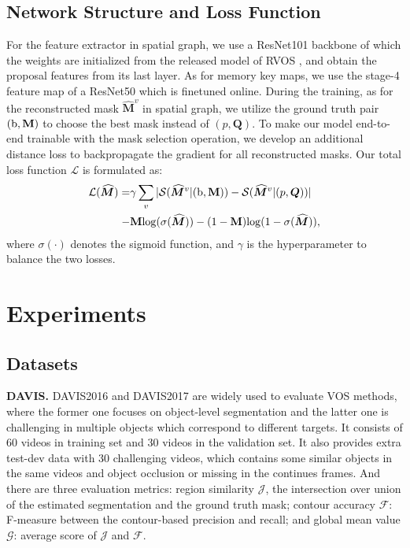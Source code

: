 \documentclass[letterpaper]{article} \usepackage{aaai21}  \usepackage{times}  \usepackage{helvet} \usepackage{courier}  \usepackage[hyphens]{url}  \usepackage{graphicx} \urlstyle{rm} \def\UrlFont{\rm}  \usepackage{graphicx}  \usepackage{natbib}  \usepackage{caption} \frenchspacing  \setlength{\pdfpagewidth}{8.5in}  \setlength{\pdfpageheight}{11in}  \usepackage{amsmath}
\begin{document}
\subsection{Network Structure and Loss Function}
For the feature extractor in spatial graph, we use a ResNet101 backbone of which the weights are initialized from the released model of RVOS \cite{ventura2019rvos}, and obtain the proposal features from its last layer. As for memory key maps, we use the stage-4 feature map of a ResNet50 which is finetuned online. During the training, as for the reconstructed mask $\widehat{\bm{M}}^{v}$ in spatial graph, we utilize the ground truth pair $(\rm{b}, \textbf{M})$ to choose the best mask instead of $(p,\bm{Q})$. To make our model end-to-end trainable with the mask selection operation, we develop an additional distance loss to backpropagate the gradient for all reconstructed masks. Our total loss function $\mathcal{L}$ is formulated as:
\begin{align}
    \mathcal{L}(\widehat{\bm{M}}) = & \gamma\sum_{v} |{\mathcal{S}}(\widehat{\bm{M}}^{v}|({\rm{b}, \textbf{M}}))-{\mathcal{S}}(\widehat{\bm{M}}^{v}|({p, \bm{Q}}))| \nonumber\\
    - & {\rm \textbf{M}}{\rm log}(\sigma(\widehat{\bm{M}})) - (1-{\rm \textbf{M}}){\rm log}(1-\sigma(\widehat{\bm{M}})),
\label{eq:loss}
\end{align}
where $\sigma(\cdot)$ denotes the sigmoid function, and $\gamma$ is the hyperparameter to balance the two losses. 


\section{Experiments}
\subsection{Datasets}
\textbf{DAVIS.} DAVIS2016 and DAVIS2017 \cite{pont20172017} are widely used to evaluate VOS methods, where the former one focuses on object-level segmentation and the latter one is challenging in multiple objects which correspond to different targets. 
It consists of 60 videos in training set and 30 videos in the validation set. It also provides extra test-dev data with 30 challenging videos, which contains some similar objects in the same videos and object occlusion or missing in the continues frames. 
And there are three evaluation metrics: region similarity $\mathcal{J}$, the intersection over union of the estimated segmentation and the ground truth mask; contour accuracy $\mathcal{F}$: F-measure between the contour-based precision and recall; and global mean value $\mathcal{G}$: average score of $\mathcal{J}$ and $\mathcal{F}$.
\end{document}
